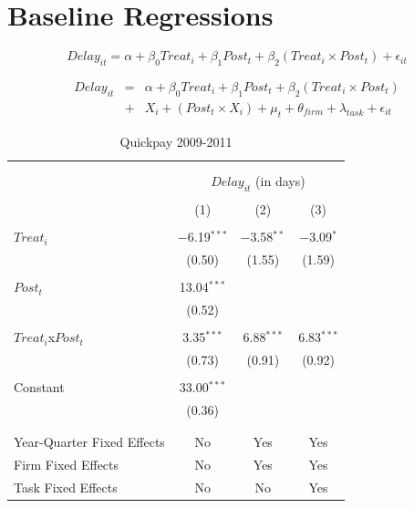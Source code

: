 \documentclass[
]{article}
\begin{document}
\hypertarget{baseline-regressions}{%
\section{Baseline Regressions}\label{baseline-regressions}}

\[ Delay_{it} = \alpha+\beta_0 Treat_i + \beta_1 Post_t + \beta_2 (Treat_i \times Post_t) + \epsilon_{it}\]

\[ \begin{aligned} Delay_{it} &=& \alpha+\beta_0 Treat_i + \beta_1 Post_t + \beta_2 (Treat_i \times Post_t)\\
&+&  X_i + (Post_t \times X_i) + \mu_t + \theta_{firm} + \lambda_{task}+ \epsilon_{it}
\end{aligned}\]

\begin{table}[H] \centering 
  \caption{Quickpay 2009-2011} 
  \label{} 
\small 
\begin{tabular}{@{\extracolsep{-2pt}}lccc} 
\\[-1.8ex]\hline 
\hline \\[-1.8ex] 
\\[-1.8ex] & \multicolumn{3}{c}{$Delay_{it}$ (in days)} \\ 
\\[-1.8ex] & (1) & (2) & (3)\\ 
\hline \\[-1.8ex] 
 $Treat_i$ & $-$6.19$^{***}$ & $-$3.58$^{**}$ & $-$3.09$^{*}$ \\ 
  & (0.50) & (1.55) & (1.59) \\ 
  & & & \\ 
 $Post_t$ & 13.04$^{***}$ &  &  \\ 
  & (0.52) &  &  \\ 
  & & & \\ 
 $Treat_i$x$Post_t$ & 3.35$^{***}$ & 6.88$^{***}$ & 6.83$^{***}$ \\ 
  & (0.73) & (0.91) & (0.92) \\ 
  & & & \\ 
 Constant & 33.00$^{***}$ &  &  \\ 
  & (0.36) &  &  \\ 
  & & & \\ 
\hline \\[-1.8ex] 
Year-Quarter Fixed Effects & No & Yes & Yes \\ 
Firm Fixed Effects & No & Yes & Yes \\ 
Task Fixed Effects & No & No & Yes \\ 

\end{tabular}
\end{table}
\end{document}
